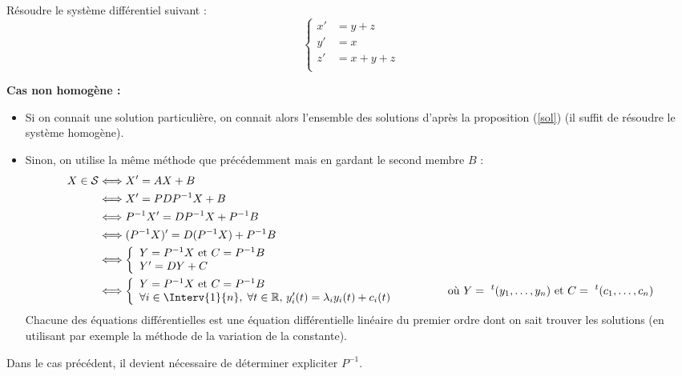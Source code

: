 \documentclass[a4paper,10pt]{report}
\begin{document}
\begin{exa} Résoudre le système différentiel suivant :
$$ \left\lbrace \begin{array}{lll}
     x'&=y+z \\
    y' & =x \\
     z'&=x+y+z \\
    \end{array}\right.$$

\end{exa}
\medskip

\noindent \textbf{Cas non homogène :} 
\begin{itemize}
\item Si on connait une solution particulière, on connait alors l'ensemble des solutions d'après la proposition (\ref{sol}) (il suffit de résoudre le système homogène).
\item Sinon, on utilise la même méthode que précédemment mais en gardant le second membre $B$ :
\begin{align*}
X \in \mathcal{S} & \Longleftrightarrow  X'=AX+B \\
& \Longleftrightarrow X'=PDP^{-1} X+B\\
& \Longleftrightarrow P^{-1}X'=DP^{-1}X + P^{-1}B\\
& \Longleftrightarrow (P^{-1}X)'=D(P^{-1}X) + P^{-1}B \\
& \Longleftrightarrow \left\lbrace \begin{array}{l}
Y=P^{-1}X \hbox{ et }  C=P^{-1}B\\
Y'=DY+C \\
\end{array}\right. \\
& \Longleftrightarrow \left\lbrace \begin{array}{l}
Y=P^{-1}X \hbox{ et }  C=P^{-1}B\\
\forall i \in \Interv{1}{n}, \; \forall t \in  \mathbb{R}, \, y_i'(t)=\lambda_i y_i(t) + c_i(t)  \\
\end{array}\right. \qquad \qquad \hbox{ où } Y= ~^t(y_1, \ldots, y_n) \hbox{ et } C= ~^t(c_1, \ldots, c_n)
\end{align*}
Chacune des équations différentielles est une équation différentielle linéaire du premier ordre dont on sait trouver les solutions (en utilisant par exemple la méthode de la variation de la constante).
\end{itemize}

\begin{rem} Dans le cas précédent, il devient nécessaire de déterminer expliciter $P^{-1}$.
\end{rem}
\medskip
\end{document}
